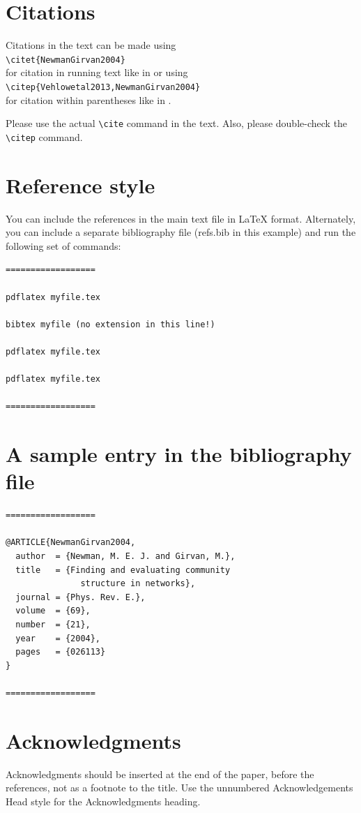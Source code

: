 \documentclass[times,twocolumn,final,authoryear]{elsarticle}
\begin{document}
\section{Citations}
Citations in the text can be made using\\[6pt]
\verb+\citet{NewmanGirvan2004}+\\[6pt]
for citation in running text like in 
\citet{NewmanGirvan2004} or using\\[6pt]
\verb+\citep{Vehlowetal2013,NewmanGirvan2004}+\\[6pt]
for citation within parentheses like in 
\citep{Vehlowetal2013,NewmanGirvan2004}.

Please use the actual \verb+\cite+ command in the text.
Also, please double-check the \verb+\citep+ command.

\section{Reference style}
You can include the references in the main text file in \LaTeX
format. Alternately, you can include a separate bibliography
file (refs.bib in this example) and run the following set of 
commands:
\begin{verbatim}
==================

pdflatex myfile.tex

bibtex myfile (no extension in this line!)

pdflatex myfile.tex

pdflatex myfile.tex

==================
\end{verbatim}

\section{A sample entry in the bibliography file}
\begin{verbatim}
==================

@ARTICLE{NewmanGirvan2004,
  author  = {Newman, M. E. J. and Girvan, M.},
  title   = {Finding and evaluating community 
               structure in networks},
  journal = {Phys. Rev. E.},
  volume  = {69},
  number  = {21},
  year    = {2004},
  pages   = {026113}
}

==================
\end{verbatim}

\section*{Acknowledgments}
Acknowledgments should be inserted at the end of the paper,
before the references, not as a footnote to the title. Use the
unnumbered Acknowledgements Head style for the Acknowledgments
heading.



\end{document}
